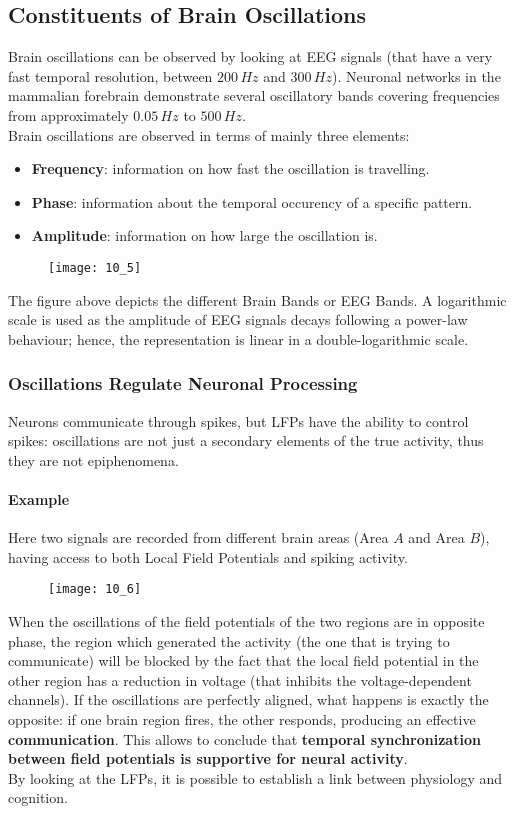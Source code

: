 \subsection{Constituents of Brain Oscillations}
Brain oscillations can be observed by looking at EEG signals (that have a very fast temporal
resolution, between \(200\,Hz\) and \(300\,Hz\)). Neuronal networks in the mammalian
forebrain demonstrate several oscillatory bands covering frequencies from approximately
\(0.05\,Hz\) to \(500\,Hz\).\\
Brain oscillations are observed in terms of mainly three elements:
\begin{itemize}
    \item \textbf{Frequency}: information on how fast the oscillation is travelling.
    \item \textbf{Phase}: information about the temporal occurency of a specific pattern.
    \item \textbf{Amplitude}: information on how large the oscillation is.
\end{itemize}
\begin{figure}[H]
    \texttt{[image: 10\_5]}
    \centering
\end{figure}
The figure above depicts the different Brain Bands or EEG Bands. A logarithmic scale is
used as the amplitude of EEG signals decays following a power-law behaviour; hence, the
representation is linear in a double-logarithmic scale.
\subsubsection{Oscillations Regulate Neuronal Processing}
Neurons communicate through spikes, but LFPs have the ability to control spikes: oscillations
are not just a secondary elements of the true activity, thus they are not epiphenomena.
\paragraph{Example}
Here two signals are recorded from different brain areas (Area \(A\) and Area \(B\)), having
access to both Local Field Potentials and spiking activity.
\begin{figure}[H]
    \texttt{[image: 10\_6]}
    \centering
\end{figure}
When the oscillations of the field potentials of the two regions are in opposite phase, the
region which generated the activity (the one that is trying to communicate) will be blocked
by the fact that the local field potential in the other region has a reduction in voltage
(that inhibits the voltage-dependent channels). If the oscillations are perfectly aligned,
what happens is exactly the opposite: if one brain region fires, the other responds,
producing an effective \textbf{communication}. This allows to conclude that
\textbf{temporal synchronization between field potentials is supportive for neural activity}.\\
By looking at the LFPs, it is possible to establish a link between physiology and cognition.
